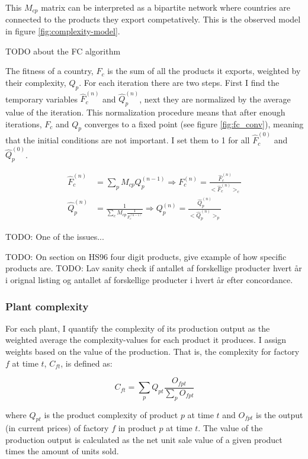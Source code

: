\documentclass[11pt]{article}
\begin{document}
This \(M_{cp}\) matrix can be interpreted as a bipartite network where countries are connected to the products they export competatively. This is the observed model in figure \ref{fig:complexity-model}. 

TODO about the FC algorithm 

The fitness of a country, \(F_{c}\) is the sum of all the products it exports, weighted by their complexity, \(Q_{p}\). For each iteration there are two steps. First I find the temporary variables \(\hat{F}^{(n)}_{c}\) and \(\hat{Q}^{(n)}_{p}\), next they are normalized by the average value of the iteration. This normalization procedure means that after enough iterations, \(F_{c}\) and \(Q_{p}\) converges to a fixed point (see figure \ref{fig:fc_conv}), meaning that the initial conditions are not important. I set them to 1 for all \(\hat{F}^{(0)}_{c}\) and \(\hat{Q}^{(0)}_{p}\).

 \[
	 \begin{split}
		 \hat{F}^{(n)}_{c} &= \sum_p M_{cp} Q^{(n-1)}_{p} \Rightarrow F^{(n)}_{c} = \frac{\hat{F}^{(n)}_{c}}{\bigg < \hat{F}^{(n)}_c \bigg > _c} \\
		 \hat{Q}^{(n)}_{p} &= \frac{1}{\sum_c M_{cp} \frac{1}{F^{(n-1)}_c}} \Rightarrow Q^{(n)}_{p} = \frac{\hat{Q}^{(n)}_{p}}{\bigg < \hat{Q}^{(n)}_p \bigg > _p }
	 \end{split}
\]

TODO: One of the issues...

TODO: On section on HS96 four digit products, give example of how specific products are.
TODO: Lav sanity check if antallet af forskellige producter hvert år i orignal listing og antallet af forskellige producter i hvert år efter concordance.

\subsubsection{Plant complexity}%
\label{sub:plant_complexity}

For each plant, I quantify the complexity of its production output as the weighted average the complexity-values for each product it produces. I assign weights based on the value of the production. That is, the complexity for factory \(f\) at time \(t\), \(C_{ft}\), is defined as:

$$
C_{ft} = \sum_p Q_{pt} \frac{O_{fpt}}{\sum_p O_{fpt}}
$$

where \(Q_{pt}\) is the product complexity of product \(p\) at time \(t\) and \(O_{fpt}\) is the output (in current prices) of factory \(f\) in product \(p\) at time \(t\). The value of the production output is calculated as the net unit sale value of a given product times the amount of units sold. 
\end{document}
